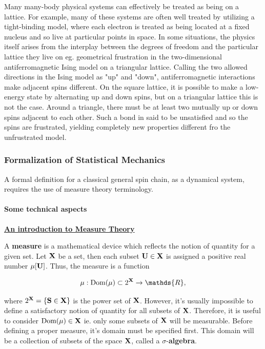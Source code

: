 \documentclass{homework}
\begin{document}
Many many-body physical systems can effectively be treated as being on a lattice. For example, many of these systems are often well treated by utilizing a tight-binding model, where each electron is treated as being located at a fixed nucleus and so live at particular points in space. In some situations, the physics itself arises from the interplay between the degrees of freedom and the particular lattice they live on eg. geometrical frustration in the two-dimensional antiferromagnetic Ising model on a triangular lattice. Calling the two allowed directions in the Ising model as "up" and "down", antiferromagnetic interactions make adjacent spins different. On the square lattice, it is possible to make a low-energy state by alternating up and down spins, but on a triangular lattice this is not the case. Around a triangle, there must be at least two mutually up or down spins adjacent to each other. Such a bond in said to be unsatisfied and so the spins are frustrated, yielding completely new properties different fro the unfrustrated model. \\

\subsubsection{Formalization of Statistical Mechanics}

A formal definition for a classical general spin chain, as a dynamical system, requires the use of measure theory terminology. \\

\paragraph{\textbf{Some technical aspects}} 
\underline{\textbf{An introduction to Measure Theory}}

A \textbf{measure} is a mathematical device which reflects the notion of quantity for a given set. Let ${\bf X}$ be a set, then each subset ${\bf U} \in {\bf X}$ is assigned a positive real number $\mu[{\bf U}]$. Thus, the measure is a function

$$
\mu: \textnormal{Dom}(\mu) \subset 2^{\bf X} \rightarrow \mathds{R},
$$

where $2^{\bf X} = \{{\bf S} \in {\bf X}\}$ is the power set of ${\bf X}$. However, it's usually impossible to define a satisfactory notion of quantity for all subsets of ${\bf X}$. Therefore, it is useful to consider 
$\textnormal{Dom}(\mu) \in {\bf X}$ ie. only some subsets of ${\bf X}$ will be measurable. Before defining a proper measure, it's domain must be specified first. This domain will be a collection of subsets of the space ${\bf X}$, called a $\sigma$-\textbf{algebra}. \\
\end{document}

